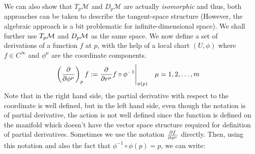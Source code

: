 We can also show that $T_p\mathcal{M}$ and $D_p\mathcal{M}$ are actually \textit{isomorphic} and thus, both approaches can be taken to describe the tangent-space structure (However, the algebraic approach is a bit problematic for infinite-dimensional space). We shall further use $T_p\mathcal M$ and $D_p\mathcal M$ as the same space.
We now define a set of derivations of a function $f$ at $p$, with the help of a local chart $(U,\phi)$ where $f\in C^\infty$ and $\phi^\mu$ are the coordinate components.
$$\left( \pdv{\phi^\mu} \right)_p f := \pdv{r^\mu}f\circ \phi^{-1}\Bigg|_{\phi(p)}\quad \mu = 1,2,\ldots, m$$
Note that in the right hand side, the partial derivative with respect to the coordinate is well defined, but in the left hand side, even though the notation is of partial derivative, the action is not well defined since the function is defined on the manifold which doesn't have the vector space structure required for definition of partial derivatives. Sometimes we use the notation $\pdv{f}{\phi^\mu}$ directly. Then, using this notation and also the fact that $\phi^{-1}\circ \phi(p) = p$, we can write:

